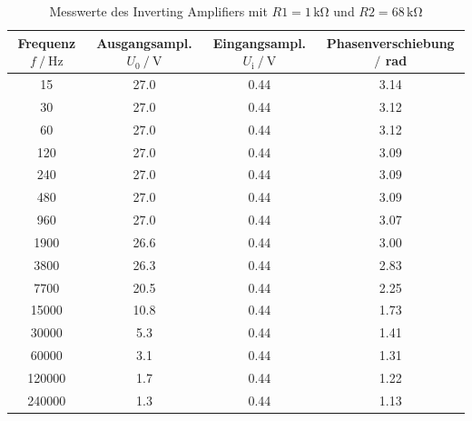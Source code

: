 \begin{table}
    \centering
    \caption{Messwerte des Inverting Amplifiers mit $R1=1\,\unit{\kilo\ohm}$ und $R2=68\,\unit{\kilo\ohm}$}
    \begin{tabular}{c c c c}
        \toprule
        Frequenz $f\mathbin{/}\unit{\hertz}$ & Ausgangsampl. $U_0\mathbin{/}\unit{\volt}$& Eingangsampl. $U_{\text{i}}\mathbin{/}\unit{\volt}$ & Phasenverschiebung $\mathbin{/}$ rad\\
        \midrule
        15&	27.0&	0.44&	3.14\\		    
        30&	27.0&	0.44&	3.12\\		
        60&	27.0&	0.44&	3.12\\		
        120&	27.0&	0.44&	3.09\\		
        240&	27.0&	0.44&	3.09\\		
        480	&27.0&	0.44&	3.09\\		
        960	&27.0&	0.44&	3.07\\		
        1900&	26.6&	0.44&	3.00\\	
        3800& 26.3&	0.44&	2.83\\	
        7700&	20.5&	0.44&	2.25\\	
        15000&	10.8&	0.44&	1.73\\	
        30000&	5.3&	0.44&	1.41	\\	
        60000&	3.1	&0.44&	1.31	\\	
        120000&	1.7	&0.44&	1.22	\\	
        240000&	1.3	&0.44&	1.13	\\
        \bottomrule
    \end{tabular}
    \label{tab:InvAmp2}
\end{table}


